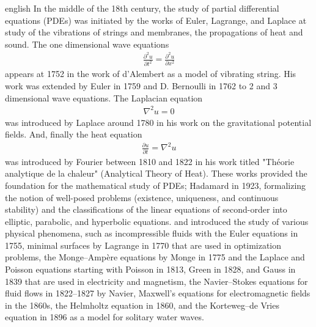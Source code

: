 \documentclass[../0000.tex]{subfiles}
\begin{document}
\begin{hyphenrules}{english}
In the middle of the 18th century, the study of partial differential equations (PDEs) was initiated by the works of Euler, Lagrange, and Laplace at study of the 
vibrations of strings and membranes, the propagations of heat and sound. The one dimensional wave equations
\begin{align*}
    \frac{\partial^2 u}{\partial t^2} = \frac{\partial^2 u}{\partial x^2}
\end{align*}
appears at 1752 in the work of d'Alembert as a model of vibrating string. His work was extended by Euler in 1759 and D. Bernoulli in 1762 to 2 and 3 dimensional 
wave equations. The Laplacian equation
\begin{align*}
    \nabla^2 u = 0
\end{align*}
was introduced by Laplace around 1780 in his work on the gravitational potential fields. And, finally the heat equation
\begin{align*}
    \frac{\partial u}{\partial t} = \nabla^2 u
\end{align*}
was introduced by Fourier between 1810 and 1822 in his work titled "Théorie analytique de la chaleur" (Analytical Theory of Heat). 
These works provided the foundation for the mathematical study of PDEs; Hadamard in 1923, formalizing the notion of well-posed problems (existence, uniqueness, 
and continuous stability) and the classifications of the linear equations of second-order into elliptic, parabolic, and hyperbolic equations.
and introduced the study of various physical phenomena, such as incompressible fluids with the Euler equations in 1755, minimal surfaces by Lagrange in 1770 
that are used in optimization problems, the Monge–Ampère equations by Monge in 1775 and the Laplace and Poisson equations starting with Poisson in 1813, 
Green in 1828, and Gauss in 1839 that are used in electricity and magnetism, the Navier–Stokes equations for fluid flows in 1822–1827 by Navier, Maxwell's 
equations for electromagnetic fields in the 1860s, the Helmholtz equation in 1860, and the Korteweg–de Vries equation in 1896 as a model for solitary water waves.


\end{hyphenrules}
\end{document}
